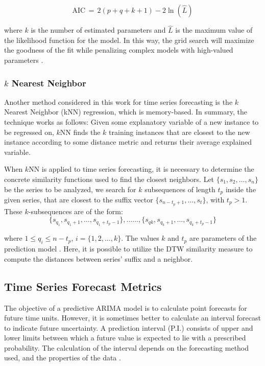\begin{equation}
\mathrm{AIC} \, = \, 2(p + q+ k + 1)-2\ln(\hat L)
\end{equation}

where $k$ is the number of estimated parameters and $\hat{L}$ is the maximum value of the likelihood function for the model. In this way, the grid search will maximize the goodness of the fit while penalizing complex models with high-valued parameters \cite{Hyndman2018}.

\subsubsection{$k$ Nearest Neighbor}
\label{Sec:TheorykNN}

Another method considered in this work for time series forecasting is the $k$ Nearest Neighbor (kNN) regression, which is memory-based. In summary, the technique works as follows: Given some explanatory variable of a new instance to be regressed on, $k$NN finds the $k$ training instances that are closest to the new instance according to some distance metric and returns their average explained variable.

When $k$NN is applied to time series forecasting, it is necessary to determine the concrete similarity functions used to find the closest neighbors. Let $\{s_{1}, s_{2}, \ldots, s_{n}\}$ be the series to be analyzed, we search for $k$ subsequences of length $t_p$ inside the given series, that are closest to the suffix vector $\{s_{n-t_{p}+1},\ldots, s_{t}\}$, with $t_{p} >1$. These $k$-subsequences are of the form: 
\begin{equation*}
    \{s_{q_{1}}, s_{q_{1}+1}, \ldots, s_{q_{1}+t_{p}-1} \}, \ldots \ldots, \{s_{q{k}}, s_{q_{k}+1}, \ldots, s_{q_{k} + t_{p}-1} \}
\end{equation*}

where $1 \leq q_{i} \leq n-t_{p}$, $i = \{1, 2, \ldots, k\}$. The values $k$ and $t_{p}$ are parameters of the prediction model \cite{Ban2013}. Here, it is possible to utilize the DTW similarity measure to compute the distances between series' suffix and a neighbor.

\subsection{Time Series Forecast Metrics}
\label{Sec:ErrorTSA}
The objective of a predictive ARIMA model is to calculate point forecasts for future time units. However, it is sometimes better to calculate an interval forecast to indicate future uncertainty. A prediction interval (P.I.) consists of upper and lower limits between which a future value is expected to lie with a prescribed probability. The calculation of the interval depends on the forecasting method used, and the properties of the data \cite{Chatfield2001}.

